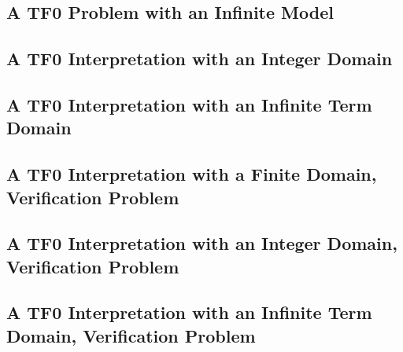 \documentclass{easychair}
\begin{document}
\newpage
\subsection{A TF0 Problem with an Infinite Model}
\label{TFF_Infinite.p}
\begin{small}

\end{small}

\newpage
\subsection{A TF0 Interpretation with an Integer Domain}
\label{TFF_Integer.s}
\begin{small}

\end{small}

\newpage
\subsection{A TF0 Interpretation with an Infinite Term Domain}
\label{TFF_Peano.s}
\begin{small}

\end{small}

\newpage
\subsection{A TF0 Interpretation with a Finite Domain, Verification Problem}
\label{TFF_Finite.s.p}
\begin{small}

\end{small}

\newpage
\subsection{A TF0 Interpretation with an Integer Domain, Verification Problem}
\label{TFF_Integer.s.p}
\begin{small}

\end{small}

\newpage
\subsection{A TF0 Interpretation with an Infinite Term Domain, Verification Problem}
\label{TFF_Peano.s.p}
\begin{small}

\end{small}
\end{document}
